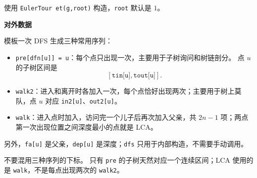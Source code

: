 使用 \texttt{EulerTour et(g,root)} 构造，\texttt{root} 默认是 $1$。

\textbf{对外数据}

模板一次 DFS 生成三种常用序列：

\begin{itemize}
  \item \texttt{pre[dfn[u]] = u}：每个点只出现一次，主要用于子树询问和树链剖分。
  点 $u$ 的子树区间是
  \[
    [\texttt{tin[u]},\texttt{tout[u]}].
  \]
  \item \texttt{walk2}：进入和离开时各加入一次，每个点恰好出现两次；主要用于树上莫队，点 $u$ 对应 \texttt{in2[u]}、\texttt{out2[u]}。
  \item \texttt{walk}：进入点时加入，访问完一个儿子后再次加入父亲，共 $2n-1$ 项；两点第一次出现位置之间深度最小的点就是 LCA。
\end{itemize}

另外，\texttt{fa[u]} 是父亲，\texttt{dep[u]} 是深度；\texttt{dfs} 只用于内部构造，不需要手动调用。

不要混用三种序列的下标。
只有 \texttt{pre} 的子树天然对应一个连续区间；LCA 使用的是 \texttt{walk}，不是每点出现两次的 \texttt{walk2}。
